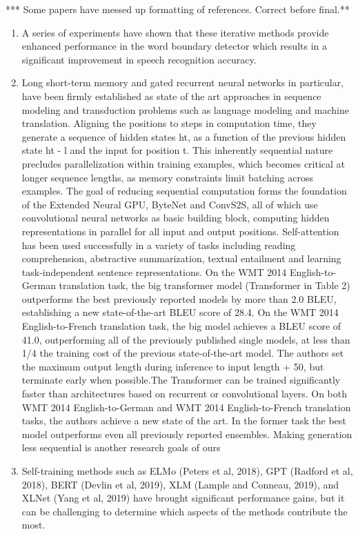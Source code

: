 \documentclass[11pt]{article}
\begin{document}
*** Some papers have messed up formatting of references. Correct before final.**
\begin{enumerate}
    \item A series of experiments have shown that these iterative methods provide enhanced performance in the word boundary detector which results in a significant improvement in speech recognition accuracy.\cite{chung}
    \item Long short-term memory\cite{lstm} and gated recurrent\cite{recurrent} neural networks in particular, have been firmly established as state of the art approaches in sequence modeling and transduction problems such as language modeling and machine translation.
    Aligning the positions to steps in computation time, they generate a sequence of hidden states ht, as a function of the previous hidden state ht - l and the input for position t. This inherently sequential nature precludes parallelization within training examples, which becomes critical at longer sequence lengths, as memory constraints limit batching across examples.
    The goal of reducing sequential computation forms the foundation of the Extended Neural GPU, ByteNet and ConvS2S, all of which use convolutional neural networks as basic building block, computing hidden representations in parallel for all input and output positions.
    Self-attention has been used successfully in a variety of tasks including reading comprehension, abstractive summarization, textual entailment and learning task-independent sentence representations. On the WMT 2014 English-to-German translation task, the big transformer model (Transformer in Table 2) outperforms the best previously reported models by more than 2.0 BLEU, establishing a new state-of-the-art BLEU score of 28.4.
    On the WMT 2014 English-to-French translation task, the big model achieves a BLEU score of 41.0, outperforming all of the previously published single models, at less than 1/4 the training cost of the previous state-of-the-art model.
    The authors set the maximum output length during inference to input length + 50, but terminate early when possible\cite{schuster}.The Transformer can be trained significantly faster than architectures based on recurrent or convolutional layers.
    On both WMT 2014 English-to-German and WMT 2014 English-to-French translation tasks, the authors achieve a new state of the art.
    In the former task the best model outperforms even all previously reported ensembles.
    Making generation less sequential is another research goals of ours\cite{atayl}
    \item Self-training methods such as ELMo (Peters et al, 2018), GPT (Radford et al, 2018), BERT (Devlin et al, 2019), XLM (Lample and Conneau, 2019), and XLNet (Yang et al, 2019) have brought significant performance gains, but it can be challenging to determine which aspects of the methods contribute the most.

\end{enumerate}
\end{document}
